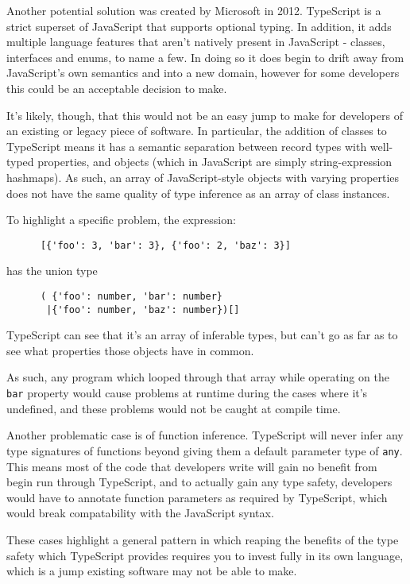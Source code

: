 \documentclass[british, twoside]{bhamthesis}
\theoremstyle{definition}
\begin{document}
    Another potential solution was created by Microsoft in 2012. TypeScript is a strict superset of JavaScript that supports optional typing. In addition, it adds multiple language features that aren't natively present in JavaScript - classes, interfaces and enums, to name a few. In doing so it does begin to drift away from JavaScript's own semantics and into a new domain, however for some developers this could be an acceptable decision to make.

    It's likely, though, that this would not be an easy jump to make for developers of an existing or legacy piece of software. In particular, the addition of classes to TypeScript means it has a semantic separation between record types with well-typed properties, and objects (which in JavaScript are simply string-expression hashmaps). As such, an array of JavaScript-style objects with varying properties does not have the same quality of type inference as an array of class instances.

    To highlight a specific problem, the expression:
    \begin{lstlisting}
      [{'foo': 3, 'bar': 3}, {'foo': 2, 'baz': 3}]
    \end{lstlisting}
    has the union type
    \begin{lstlisting}
      ( {'foo': number, 'bar': number}
       |{'foo': number, 'baz': number})[]
    \end{lstlisting}

    TypeScript can see that it's an array of inferable types, but can't go as far as to see what properties those objects have in common.

    As such, any program which looped through that array while operating on the \texttt {bar} property would cause problems at runtime during the cases where it's undefined, and these problems would not be caught at compile time.

    Another problematic case is of function inference. TypeScript will never infer any type signatures of functions beyond giving them a default parameter type of \texttt{any}. This means most of the code that developers write will gain no benefit from begin run through TypeScript, and to actually gain any type safety, developers would have to annotate function parameters as required by TypeScript, which would break compatability with the JavaScript syntax.

    These cases highlight a general pattern in which reaping the benefits of the type safety which TypeScript provides requires you to invest fully in its own language, which is a jump existing software may not be able to make.
\end{document}
